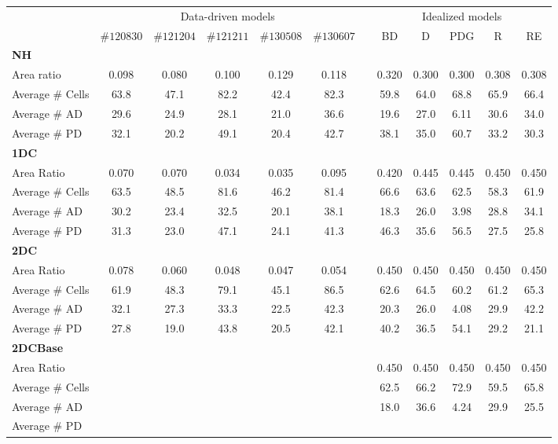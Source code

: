 \documentclass[11pt,a4paper, final]{article}
\begin{document}
%
\begin{table}\centering
\begin{tabular}{@{}lccccccccccc@{}}\toprule
& \multicolumn{5}{c}{Data-driven models} & \phantom{abc}& \multicolumn{5}{c}{Idealized models}\\
\cmidrule{2-6} \cmidrule{8-12}
& $\#120830$ & $\#121204$ & $\#121211$ & $\#130508$ & $\#130607$ && BD & D & PDG & R & RE\\ \midrule
\textbf{NH}\\
Area ratio & 0.098 & 0.080 & 0.100 & 0.129 & 0.118 &&
0.320 & 0.300 & 0.300 & 0.308 & 0.308\\
Average $\#$ Cells & 63.8 & 47.1 & 82.2 & 42.4 & 82.3 &&
59.8 & 64.0 & 68.8 & 65.9 & 66.4\\
Average $\#$ AD & 29.6 & 24.9 & 28.1 & 21.0 & 36.6 &&
19.6 & 27.0 & 6.11 & 30.6 & 34.0\\
Average $\#$ PD & 32.1 & 20.2 & 49.1 & 20.4 & 42.7 &&
38.1 & 35.0 & 60.7 & 33.2 & 30.3\\
\textbf{1DC}\\
Area Ratio & 0.070 & 0.070 & 0.034 & 0.035 & 0.095 &&
0.420 & 0.445 & 0.445 & 0.450 & 0.450\\
Average $\#$ Cells & 63.5 & 48.5 & 81.6 & 46.2 & 81.4 &&
66.6 & 63.6 & 62.5 & 58.3 & 61.9\\
Average $\#$ AD & 30.2 & 23.4 & 32.5 & 20.1 & 38.1 &&
18.3 & 26.0 & 3.98 & 28.8 & 34.1\\
Average $\#$ PD & 31.3 & 23.0 & 47.1 & 24.1 & 41.3 &&
46.3 & 35.6 & 56.5 & 27.5 & 25.8\\
\textbf{2DC}\\
Area Ratio & 0.078 & 0.060 & 0.048 & 0.047 & 0.054 &&
0.450 & 0.450 & 0.450 & 0.450 & 0.450\\
Average $\#$ Cells & 61.9 & 48.3 & 79.1 & 45.1 & 86.5 &&
62.6 & 64.5 & 60.2 & 61.2 & 65.3\\
Average $\#$ AD & 32.1 & 27.3 & 33.3 & 22.5 & 42.3 &&
20.3 & 26.0 & 4.08 & 29.9 & 42.2\\
Average $\#$ PD & 27.8 & 19.0 & 43.8 & 20.5 & 42.1 &&
40.2 & 36.5 & 54.1 & 29.2 & 21.1\\
\textbf{2DCBase}\\
Area Ratio & & & & & &&
0.450 & 0.450 & 0.450 & 0.450 & 0.450\\
Average $\#$ Cells & & & & & &&
62.5 & 66.2 & 72.9 & 59.5 & 65.8\\
Average $\#$ AD & & & & & &&
18.0 & 36.6 & 4.24 & 29.9 & 25.5\\
Average $\#$ PD & & & & & &&

\end{tabular}
\end{table}
\end{document}
